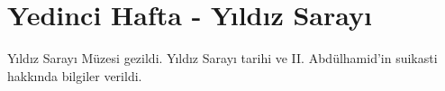 \section{Yedinci Hafta - Yıldız Sarayı}
\indent\indent Yıldız Sarayı Müzesi gezildi. Yıldız Sarayı tarihi ve II. Abdülhamid’in suikasti hakkında bilgiler verildi.



